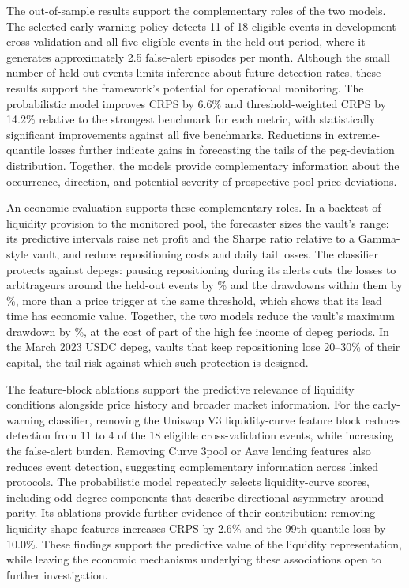 \documentclass[a4paper,fleqn]{cas-sc}
\begin{document}
The out-of-sample results support the complementary roles of the two models. The selected early-warning policy detects 11 of 18 eligible events in development cross-validation and all five eligible events in the held-out period, where it generates approximately 2.5 false-alert episodes per month. Although the small number of held-out events limits inference about future detection rates, these results support the framework's potential for operational monitoring. The probabilistic model improves CRPS by 6.6\% and threshold-weighted CRPS by 14.2\% relative to the strongest benchmark for each metric, with statistically significant improvements against all five benchmarks. Reductions in extreme-quantile losses further indicate gains in forecasting the tails of the peg-deviation distribution. Together, the models provide complementary information about the occurrence, direction, and potential severity of prospective pool-price deviations.

An economic evaluation supports these complementary roles. In a backtest of liquidity provision to the
monitored pool, the forecaster sizes the vault's range: its predictive intervals raise net profit and the
Sharpe ratio relative to a Gamma-style vault, and reduce repositioning costs and daily tail losses. The
classifier protects against depegs: pausing repositioning during its alerts cuts the losses to arbitrageurs
around the held-out events by \lpFcKEvLVRCut\% and the drawdowns within them by \lpFcKEventDDCut\%, more
than a price trigger at the same threshold, which shows that its lead time has economic value. Together,
the two models reduce the vault's maximum drawdown by \lpFcKvsGammaMaxDDCut\%, at the cost of part of the
high fee income of depeg periods. In the March 2023 USDC depeg, vaults that keep repositioning lose 20--30\%
of their capital, the tail risk against which such protection is designed.

The feature-block ablations support the predictive relevance of liquidity conditions alongside price history and broader market information. For the early-warning classifier, removing the Uniswap V3 liquidity-curve feature block reduces detection from 11 to 4 of the 18 eligible cross-validation events, while increasing the false-alert burden. Removing Curve 3pool or Aave lending features also reduces event detection, suggesting complementary information across linked protocols. The probabilistic model repeatedly selects liquidity-curve scores, including odd-degree components that describe directional asymmetry around parity. Its ablations provide further evidence of their contribution: removing liquidity-shape features increases CRPS by 2.6\% and the 99th-quantile loss by 10.0\%. These findings support the predictive value of the liquidity representation, while leaving the economic mechanisms underlying these associations open to further investigation.
\end{document}
